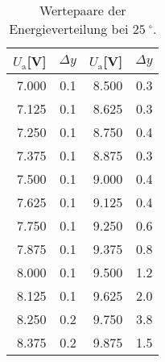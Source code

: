 
\begin{table}[!h]
\begin{center}
\begin{tabular}{|r|r|r|r|}
\hline
$U_\mathrm{a}$[V] & $\Delta y$ & $U_\mathrm{a}$[V] & $\Delta y$\\
\hline
\hline

7.000 	& 0.1 & 8.500 	& 0.3 \\
7.125 	& 0.1 & 8.625 	& 0.3 \\
7.250 	& 0.1 & 8.750 	& 0.4 \\
7.375 	& 0.1 & 8.875 	& 0.3 \\
7.500 	& 0.1 & 9.000 	& 0.4 \\
7.625 	& 0.1 & 9.125   & 0.4 \\
7.750 	& 0.1 & 9.250 	& 0.6 \\
7.875 	& 0.1 & 9.375 	& 0.8 \\
8.000 	& 0.1 & 9.500 	& 1.2 \\
8.125 	& 0.1 & 9.625 	& 2.0 \\
8.250 	& 0.2 & 9.750 	& 3.8 \\
8.375 	& 0.2 & 9.875 	& 1.5 \\

\hline
\end{tabular}
\caption[]{Wertepaare der Energieverteilung bei $\SI{25}{^\circ}$.}
\label{tab:a1}
\end{center}
\end{table}